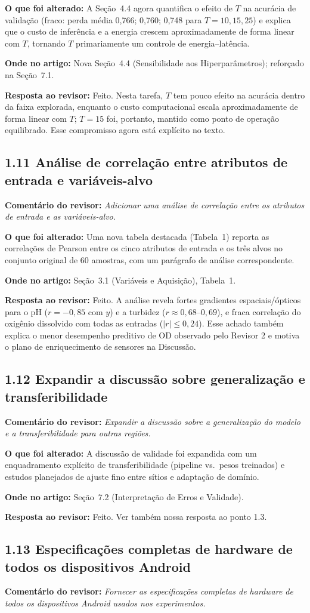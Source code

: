 \documentclass[11pt,a4paper]{article}
\newcommand{\comment}[1]{\textbf{Comentário do revisor:} \textit{#1}}
\newcommand{\change}[1]{\textbf{O que foi alterado:} #1}
\newcommand{\where}[1]{\textbf{Onde no artigo:} #1}
\newcommand{\resp}[1]{\textbf{Resposta ao revisor:} \textcolor{revblue}{#1}}
\newcommand{\pt}[1]{\subsection*{#1}}
\begin{document}
\change{A Seção~4.4 agora quantifica o efeito de $T$ na acurácia de validação (fraco: perda média 0,766; 0,760; 0,748 para $T=10,15,25$) e explica que o custo de inferência e a energia crescem aproximadamente de forma linear com $T$, tornando $T$ primariamente um controle de energia--latência.}

\where{Nova Seção~4.4 (Sensibilidade aos Hiperparâmetros); reforçado na Seção~7.1.}

\resp{Feito. Nesta tarefa, $T$ tem pouco efeito na acurácia dentro da faixa explorada, enquanto o custo computacional escala aproximadamente de forma linear com $T$; $T=15$ foi, portanto, mantido como ponto de operação equilibrado. Esse compromisso agora está explícito no texto.}

\pt{1.11 Análise de correlação entre atributos de entrada e variáveis-alvo}
\comment{Adicionar uma análise de correlação entre os atributos de entrada e as variáveis-alvo.}

\change{Uma nova tabela destacada (Tabela~1) reporta as correlações de Pearson entre os cinco atributos de entrada e os três alvos no conjunto original de 60 amostras, com um parágrafo de análise correspondente.}

\where{Seção~3.1 (Variáveis e Aquisição), Tabela~1.}

\resp{Feito. A análise revela fortes gradientes espaciais/ópticos para o pH ($r=-0{,}85$ com $y$) e a turbidez ($r\approx 0{,}68$--$0{,}69$), e fraca correlação do oxigênio dissolvido com todas as entradas ($|r| \leq 0{,}24$). Esse achado também explica o menor desempenho preditivo de OD observado pelo Revisor 2 e motiva o plano de enriquecimento de sensores na Discussão.}

\pt{1.12 Expandir a discussão sobre generalização e transferibilidade}
\comment{Expandir a discussão sobre a generalização do modelo e a transferibilidade para outras regiões.}

\change{A discussão de validade foi expandida com um enquadramento explícito de transferibilidade (pipeline vs.\ pesos treinados) e estudos planejados de ajuste fino entre sítios e adaptação de domínio.}

\where{Seção~7.2 (Interpretação de Erros e Validade).}

\resp{Feito. Ver também nossa resposta ao ponto 1.3.}

\pt{1.13 Especificações completas de hardware de todos os dispositivos Android}
\comment{Fornecer as especificações completas de hardware de todos os dispositivos Android usados nos experimentos.}
\end{document}
